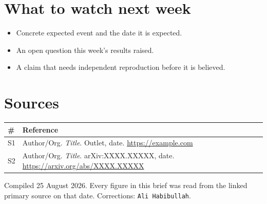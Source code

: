 \documentclass[11pt,a4paper]{article}
\newcommand{\briefdate}{25 August 2026}            %
\newcommand{\briefauthor}{Ali Habibullah}          %
\newcommand{\srcref}[1]{\textcolor{brandaccent}{[S#1]}}
\begin{document}
\section{What to watch next week}
\begin{itemize}
  \item Concrete expected event and the date it is expected.
  \item An open question this week's results raised.
  \item A claim that needs independent reproduction before it is believed.
\end{itemize}

\section{Sources}
{\footnotesize
\begin{tabularx}{\textwidth}{@{}l X@{}}
\toprule
\textbf{\#} & \textbf{Reference} \\
\midrule
S1 & Author/Org. \emph{Title}. Outlet, date. \url{https://example.com} \\
S2 & Author/Org. \emph{Title}. arXiv:XXXX.XXXXX, date. \url{https://arxiv.org/abs/XXXX.XXXXX} \\
\bottomrule
\end{tabularx}}

\vspace{0.8em}
{\footnotesize\color{brandgrey}
Compiled \briefdate. Every figure in this brief was read from the linked primary
source on that date. Corrections: \texttt{\briefauthor}.}
\end{document}
